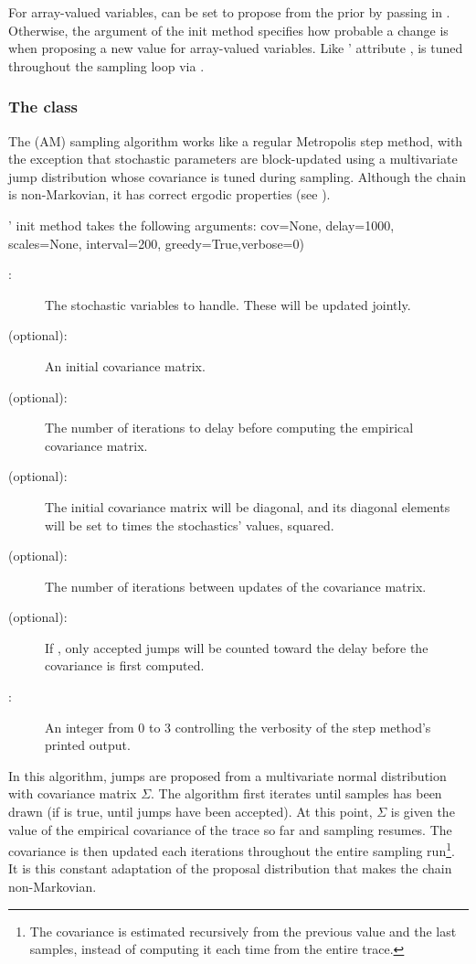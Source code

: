 For array-valued variables,  can be set to propose from the prior by passing in . Otherwise, the argument  of the init method specifies how probable a change is when proposing a new value for array-valued variables. Like ' attribute ,  is tuned throughout the sampling loop via .

\subsubsection[The AdaptiveMetropolis class]{The
 class} 
The  (AM) sampling algorithm works like a regular Metropolis step method, with the exception that stochastic parameters are block-updated using a multivariate jump distribution whose covariance is tuned during sampling. Although the chain is non-Markovian, it has correct ergodic properties (see \cite{Haario:2001lr}).

' init method takes the following arguments:
cov=None, delay=1000, scales=None, interval=200, greedy=True,verbose=0)
\begin{description}
   \item[:] The stochastic variables to handle. These will be updated jointly.
   \item[ (optional):] An initial covariance matrix.
   \item[ (optional):] The number of iterations to delay before computing the empirical covariance matrix.
   \item[ (optional):] The initial covariance matrix will be diagonal, and its diagonal elements will be set to  times the stochastics' values, squared.
   \item[ (optional):] The number of iterations between updates of the covariance matrix.
   \item[ (optional):] If , only accepted jumps will be counted toward the delay before the covariance is first computed.
   \item[:] An integer from 0 to 3 controlling the verbosity of the step method's printed output.   
\end{description}
 
In this algorithm, jumps are proposed from a multivariate normal
distribution with covariance matrix $\Sigma$. The algorithm first iterates
until  samples has been drawn (if  is true, until
 jumps have been accepted). At this point, $\Sigma$ is given 
the value of the empirical covariance of the trace so far and sampling
resumes. The covariance is then updated each 
iterations throughout the entire sampling run\footnote{The covariance is
estimated recursively from the previous value and the last 
samples, instead of computing it each time from the entire trace.}. It is
this constant adaptation of the proposal distribution that makes the chain
non-Markovian. 


